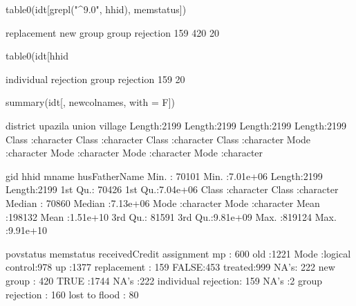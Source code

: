 \begin{Schunk}
\begin{Sinput}
table0(idt[grepl("^9.0", hhid), memstatus])
\end{Sinput}
\begin{Soutput}

    replacement       new group group rejection 
            159             420              20 
\end{Soutput}
\begin{Sinput}
table0(idt[hhid %in% gsub("^9.0", "", idt[grepl("^9.0", hhid), hhid]), memstatus])
\end{Sinput}
\begin{Soutput}

individual rejection      group rejection 
                 159                   20 
\end{Soutput}
\begin{Sinput}
summary(idt[, newcolnames, with = F])
\end{Sinput}
\begin{Soutput}
   district           upazila             union             village         
 Length:2199        Length:2199        Length:2199        Length:2199       
 Class :character   Class :character   Class :character   Class :character  
 Mode  :character   Mode  :character   Mode  :character   Mode  :character  
                                                                            
                                                                            
                                                                            
                                                                            
      gid              hhid             mname           husFatherName     
 Min.   : 70101   Min.   :7.01e+06   Length:2199        Length:2199       
 1st Qu.: 70426   1st Qu.:7.04e+06   Class :character   Class :character  
 Median : 70860   Median :7.13e+06   Mode  :character   Mode  :character  
 Mean   :198132   Mean   :1.51e+10                                        
 3rd Qu.: 81591   3rd Qu.:9.81e+09                                        
 Max.   :819124   Max.   :9.91e+10                                        
                                                                          
 povstatus                  memstatus    receivedCredit    assignment 
 mp  : 600   old                 :1221   Mode :logical   control:978  
 up  :1377   replacement         : 159   FALSE:453       treated:999  
 NA's: 222   new group           : 420   TRUE :1744      NA's   :222  
             individual rejection: 159   NA's :2                      
             group rejection     : 160                                
             lost to flood       :  80                                
                                                                      

\end{Soutput}
\end{Schunk}
